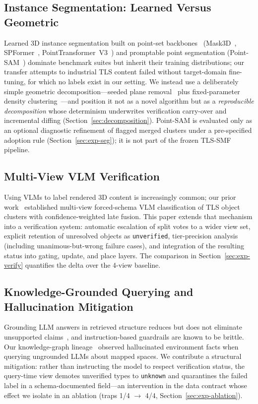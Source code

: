 \documentclass[electronics,article,accept,pdftex,moreauthors]{Definitions/mdpi}
\begin{document}
\subsection{Instance Segmentation: Learned Versus Geometric}
Learned 3D instance segmentation built on point-set
backbones~\cite{qi2017pointnetpp}
(Mask3D~\cite{schult2023mask3d}, SPFormer~\cite{sun2023spformer},
PointTransformer~V3~\cite{wu2024ptv3}) and promptable point
segmentation (Point-SAM~\cite{zhou2024pointsam}) dominate benchmark suites
but inherit their training distributions; our transfer attempts to
industrial TLS content failed without target-domain fine-tuning, for which
no labels exist in our setting. We instead use a deliberately simple
geometric decomposition---seeded plane
removal~\cite{fischler1981ransac,schnabel2007efficient} plus
fixed-parameter density clustering~\cite{ester1996dbscan}---and position
it not as a novel algorithm but as a
\emph{reproducible decomposition} whose determinism underwrites
verification carry-over and incremental diffing
(Section~\ref{sec:decomposition}). Point-SAM is evaluated only as an optional
diagnostic refinement of flagged merged clusters under a pre-specified
adoption rule (Section~\ref{sec:exp-seg}); it is not part of the frozen
TLS-SMF pipeline.

\subsection{Multi-View VLM Verification}
Using VLMs to label rendered 3D content is increasingly common; our prior
work~\cite{kim2026ictc} established multi-view forced-schema VLM
classification of TLS object clusters with confidence-weighted late fusion.
This paper extends that mechanism into a verification system: automatic
escalation of split votes to a wider view set, explicit retention of
unresolved objects as \texttt{unverified}, tier-precision analysis
(including unanimous-but-wrong failure cases), and integration of the
resulting status into gating, update, and place layers. The comparison in
Section~\ref{sec:exp-verify} quantifies the delta over the 4-view baseline.

\subsection{Knowledge-Grounded Querying and Hallucination Mitigation}
Grounding LLM answers in retrieved structure reduces but does not eliminate
unsupported claims~\cite{lewis2020rag,ji2023hallucination}, and
instruction-based guardrails are known to be brittle. Our knowledge-graph lineage~\cite{kim2025isis} observed
hallucinated environment facts when querying ungrounded LLMs about mapped
spaces. We contribute a structural mitigation: rather than instructing the
model to respect verification status, the query-time view demotes unverified
types to \texttt{unknown} and quarantines the failed label in a
schema-documented field---an intervention in the data contract whose effect
we isolate in an ablation (traps 1/4 $\rightarrow$ 4/4,
Section~\ref{sec:exp-ablation}).
\end{document}
